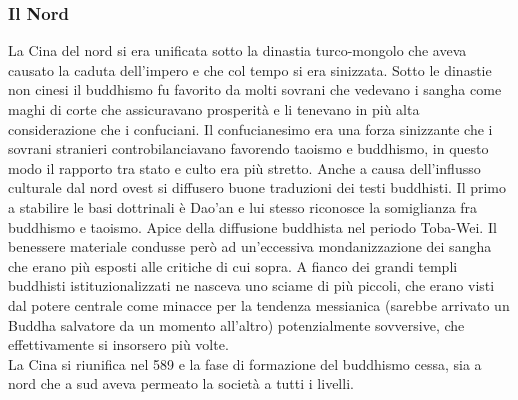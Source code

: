 \documentclass[10pt,a4paper]{report}
\begin{document}
\subsubsection{Il Nord}
La Cina del nord si era unificata sotto la dinastia turco-mongolo che aveva causato la caduta dell'impero e che col tempo si era sinizzata. Sotto le dinastie non cinesi il buddhismo fu favorito da molti sovrani che vedevano i sangha come maghi di corte che assicuravano prosperità e li tenevano in più alta considerazione che i confuciani. Il confucianesimo era una forza sinizzante che i sovrani stranieri controbilanciavano favorendo taoismo e buddhismo, in questo modo il rapporto tra stato e culto era più stretto. Anche a causa dell'influsso culturale dal nord ovest si diffusero buone traduzioni dei testi buddhisti. Il primo a stabilire le basi dottrinali è Dao'an e lui stesso riconosce la somiglianza fra buddhismo e taoismo. Apice della diffusione buddhista nel periodo Toba-Wei. Il benessere materiale condusse però ad un'eccessiva mondanizzazione dei sangha che erano più esposti alle critiche di cui sopra. A fianco dei grandi templi buddhisti istituzionalizzati ne nasceva uno sciame di più piccoli, che erano visti dal potere centrale come minacce per la tendenza messianica (sarebbe arrivato un Buddha salvatore da un momento all'altro) potenzialmente sovversive, che effettivamente si insorsero più volte. \\
La Cina si riunifica nel 589 e la fase di formazione del buddhismo cessa, sia a nord che a sud aveva permeato la società a tutti i livelli.
\end{document}
